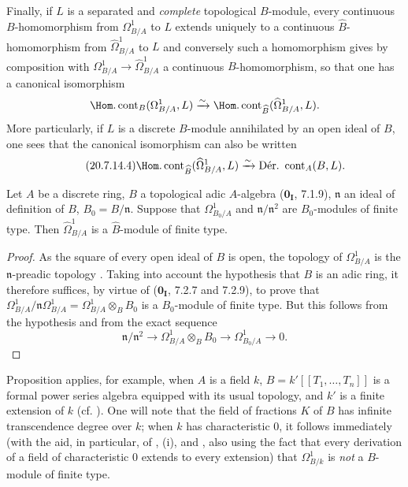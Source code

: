 \begin{env}[20.7.14]
Finally, if $L$ is a separated and \emph{complete} topological $B$-module, every continuous $B$-homomorphism from $\Omega^1_{B/A}$ to $L$ extends uniquely to a continuous $\widehat{B}$-homomorphism from $\widehat{\Omega}^1_{B/A}$ to $L$ and conversely such a homomorphism gives by composition with $\Omega^1_{B/A}\to\widehat{\Omega}^1_{B/A}$ a continuous $B$-homomorphism, so that one has a canonical isomorphism
\[
  \Hom.\operatorname{cont}_B(\Omega^1_{B/A},L)\xrightarrow{\sim}\Hom.\operatorname{cont}_{\widehat{B}}(\widehat{\Omega}^1_{B/A},L).
\]
More particularly, if $L$ is a discrete $B$-module annihilated by an open ideal of $B$, one sees that the canonical isomorphism  can also be written
\begin{equation}
\tag{20.7.14.4}
  \label{0.20.7.14.4}
  \Hom.\operatorname{cont}_{\widehat{B}}(\widehat{\Omega}^1_{B/A},L)\xrightarrow{\sim}\operatorname{D\acute{e}r.\ cont}_A(B,L).
\end{equation}
\end{env}

\begin{proposition}[20.7.15]
\label{0.20.7.15}
Let $A$ be a discrete ring, $B$ a topological adic $A$-algebra ($\mathbf{0_I}$, 7.1.9), $\mathfrak{n}$ an ideal of definition of $B$, $B_0=B/\mathfrak{n}$.
Suppose that $\Omega^1_{B_0/A}$ and $\mathfrak{n}/\mathfrak{n}^2$ are $B_0$-modules of finite type.
Then $\widehat{\Omega}^1_{B/A}$ is a $\widehat{B}$-module of finite type.
\end{proposition}

\begin{proof}
As the square of every open ideal of $B$ is open, the topology of $\Omega^1_{B/A}$ is the $\mathfrak{n}$-preadic topology .
Taking into account the hypothesis that $B$ is an adic ring, it therefore suffices, by virtue of ($\mathbf{0_I}$, 7.2.7 and 7.2.9), to prove
that $\Omega^1_{B/A}/\mathfrak{n}\Omega^1_{B/A}=\Omega^1_{B/A}\otimes_B B_0$ is a $B_0$-module of finite type. But this follows from the hypothesis and from the exact sequence 
\[
  \mathfrak{n}/\mathfrak{n}^2\longrightarrow \Omega^1_{B/A}\otimes_B B_0\longrightarrow \Omega^1_{B_0/A}\longrightarrow 0.
\]
\end{proof}

\begin{env}[20.7.16]
\label{0.20.7.16}
Proposition  applies, for example, when $A$ is a field $k$, $B=k'[[T_1,\ldots,T_n]]$ is a formal power series algebra equipped with its usual topology, and $k'$ is a finite extension of $k$ (cf. ). One will note that the field of fractions $K$ of $B$ has infinite transcendence degree over $k$; when $k$ has characteristic $0$, it follows immediately (with the aid, in particular, of , (i), and , also using the fact that every derivation of a field of characteristic $0$ extends to every extension) that $\Omega^1_{B/k}$ is \emph{not} a $B$-module of finite type.
\end{env}

